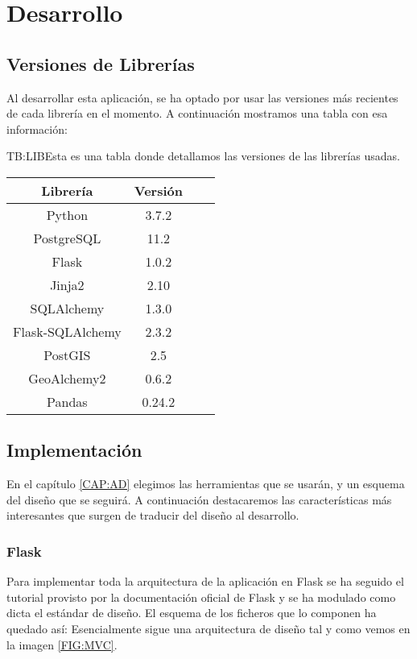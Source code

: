
\chapter{Desarrollo\label{CAP:DESARROLLO}}
  \section{Versiones de Librerías}
    Al desarrollar esta aplicación, se ha optado por usar las versiones más recientes de cada librería en el momento. A continuación mostramos una tabla con esa información:

    \begin{table}[Tabla de versiones de librerías]{TB:LIB}{Esta es una tabla donde detallamos las versiones de las librerías usadas.}
      \begin{tabular}{cccc}
        \hline
        \textbf{Librería} & \textbf{Versión} \\
        \hline \hline
        Python & 3.7.2 \\
        PostgreSQL & 11.2 \\
        Flask & 1.0.2 \\
        Jinja2 & 2.10 \\
        SQLAlchemy & 1.3.0 \\ 
        Flask-SQLAlchemy & 2.3.2 \\
        PostGIS & 2.5 \\
        GeoAlchemy2 & 0.6.2 \\
        Pandas & 0.24.2 \\
        \hline
      \end{tabular}
    \end{table}
  \section{Implementación}
    En el capítulo \ref{CAP:AD} elegimos las herramientas que se usarán, y un esquema del diseño que se seguirá. A continuación destacaremos las características más interesantes que surgen de traducir del diseño al desarrollo.
    \subsection{Flask}
      Para implementar toda la arquitectura de la aplicación en Flask se ha seguido el tutorial provisto por la documentación oficial de Flask \cite{flask} y se ha modulado como dicta el estándar de diseño. El esquema de los ficheros que lo componen ha quedado así:
      Esencialmente sigue una arquitectura de diseño  tal y como vemos en la imagen \ref{FIG:MVC}.
      

